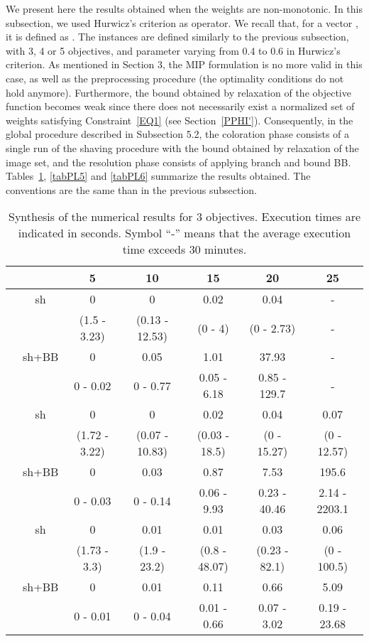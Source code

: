 \documentclass[final,3p,times]{elsarticle}
\begin{document}
We present here the results obtained when the weights are
non-monotonic. In this subsection, we used Hurwicz's criterion as
 operator. We recall that, for a vector , it is defined as
. The instances are defined
similarly to the previous subsection, with 3, 4 or 5 objectives, and
parameter  varying from 0.4 to 0.6 in Hurwicz's criterion. As
mentioned in Section 3, the MIP formulation is no more valid in this
case, as well as the preprocessing procedure (the optimality
conditions do not hold anymore). Furthermore, the bound obtained by
relaxation of the objective function becomes weak since there does not
necessarily exist a normalized set of weights satisfying
Constraint~\ref{EQ1} (see Section~\ref{PPHI'}). Consequently, in the
global procedure described in Subsection 5.2, the coloration phase consists of a
single run of the shaving procedure with the bound obtained by
relaxation of the image set, and the resolution phase consists of
applying branch and bound BB. Tables~\ref{tabPL4}, \ref{tabPL5}
and \ref{tabPL6} summarize the results obtained. The conventions are the same than in the previous subsection.

\begin{table}[!h]
  \begin{center}
 {\small 
 \begin{tabular}{|c|c|ccccc|}
    \hline
      \rule[1pt]{0pt}{13pt} 
       & & 5&10&15&20&25\\
       \hline
  \hline
       & sh&0&0&0.02&0.04&-\\
          & &(1.5 - 3.23)&(0.13 - 12.53)&(0 - 4)&(0 - 2.73)& - \\
       \cline{2-7} 
       &sh+BB&0&0.05&1.01&37.93&-\\
       &  & 0 - 0.02&0 - 0.77&0.05 - 6.18&0.85 - 129.7& - \\
  \hline
\hline
   & sh&0&0&0.02&0.04&0.07\\
  & &(1.72 - 3.22)&(0.07 - 10.83)&(0.03 - 18.5)&(0 - 15.27)&(0 - 12.57)\\

    \cline{2-7} 
 &sh+BB&0&0.03&0.87&7.53&195.6\\
  &  &0 - 0.03&0 - 0.14&0.06 - 9.93&0.23 - 40.46&2.14 - 2203.1\\
  \hline
  \hline
  & sh&0&0.01&0.01&0.03&0.06\\
    & &(1.73 - 3.3)&(1.9 - 23.2)&(0.8 - 48.07)&(0.23 - 82.1)&(0 - 100.5)\\
  \cline{2-7} 
  &sh+BB&0&0.01&0.11&0.66&5.09\\
  &  &0 - 0.01&0 - 0.04&0.01 - 0.66&0.07 - 3.02&0.19 - 23.68\\
  \hline
    \end{tabular}
}
\end{center}
\caption{\label{tabPL4} Synthesis of the numerical results for 3 objectives. Execution times are indicated in seconds. Symbol ``-'' means that the average execution time exceeds 30 minutes.}
\end{table}
\end{document}

